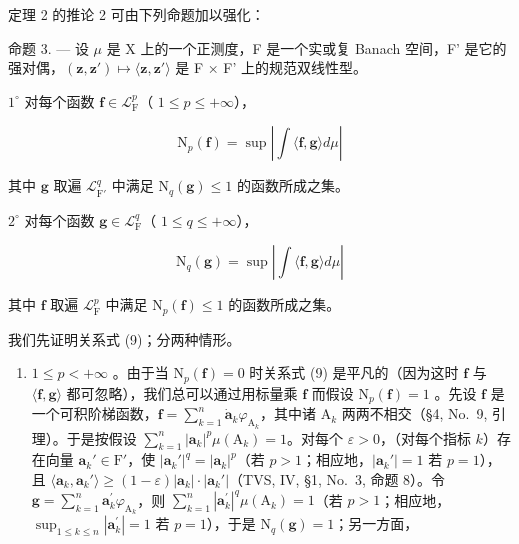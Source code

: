 定理 2 的推论 2 可由下列命题加以强化：

命题 3. --- 设 \(\mu\) 是 X 上的一个正测度，F 是一个实或复 Banach 空间，F' 是它的强对偶，\((\mathbf{z},\mathbf{z}')\mapsto\langle\mathbf{z},\mathbf{z}'\rangle\) 是 F × F' 上的规范双线性型。

\(1^{\circ}\) 对每个函数 \(\mathbf{f} \in \mathcal{L}_{\mathrm{F}}^{p}\)（ \(1 \leqslant p \leqslant +\infty\)），

\[
\mathrm{N} _ {p} (\mathbf {f}) = \sup \left| \int \langle \mathbf {f}, \mathbf {g} \rangle d \mu \right|\tag{9}
\]

其中 \(\mathbf{g}\) 取遍 \(\mathcal{L}_{\mathrm{F}'}^q\) 中满足 \(\mathrm{N}_q(\mathbf{g}) \leqslant 1\) 的函数所成之集。

\(2^{\circ}\) 对每个函数 \(\mathbf{g} \in \mathcal{L}_{\mathrm{F}}^{q}\)（ \(1 \leqslant q \leqslant +\infty\)），

\[
\mathrm{N} _ {q} (\mathbf {g}) = \sup \left| \int \langle \mathbf {f}, \mathbf {g} \rangle d \mu \right|\tag{10}
\]

其中 \(\mathbf{f}\) 取遍 \(\mathcal{L}_{\mathrm{F}}^{p}\) 中满足 \(\mathrm{N}_p(\mathbf{f})\leqslant 1\) 的函数所成之集。

我们先证明关系式 (9)；分两种情形。

\begin{enumerate}
\def\labelenumi{(\roman{enumi})}
\tightlist
\item
  \(1 \leqslant p < +\infty\) 。由于当 \(\mathrm{N}_p(\mathbf{f}) = 0\) 时关系式 (9) 是平凡的（因为这时 \(\mathbf{f}\) 与 \(\langle \mathbf{f}, \mathbf{g} \rangle\) 都可忽略），我们总可以通过用标量乘 \(\mathbf{f}\) 而假设 \(\mathrm{N}_p(\mathbf{f}) = 1\) 。先设 \(\mathbf{f}\) 是一个可积阶梯函数，\(\mathbf{f} = \sum_{k=1}^{n} \dot{\mathbf{a}}_k \varphi_{\mathrm{A}_k}\)，其中诸 \(\mathrm{A}_k\) 两两不相交（§4, No.~9, 引理）。于是按假设 \(\sum_{k=1}^{n} |\mathbf{a}_k|^p \mu(\mathrm{A}_k) = 1\)。对每个 \(\varepsilon > 0\)，（对每个指标 \(k\)）存在向量 \(\mathbf{a}_k' \in \mathrm{F}'\)，使 \(|\mathbf{a}_k'|^q = |\mathbf{a}_k|^p\)（若 \(p > 1\)；相应地，\(|\mathbf{a}_k'| = 1\) 若 \(p = 1\)），且 \(\langle \mathbf{a}_k, \mathbf{a}_k' \rangle \geqslant (1 - \varepsilon) |\mathbf{a}_k| \cdot |\mathbf{a}_k'|\)（TVS, IV, §1, No.~3, 命题 8）。令 \(\mathbf{g} = \sum_{k=1}^{n} \mathbf{a}_{k}^{\prime} \varphi_{\mathrm{A}_{k}}\)，则 \(\sum_{k=1}^{n} |\mathbf{a}_{k}^{\prime}|^{q} \mu(\mathrm{A}_{k}) = 1\)（若 \(p > 1\)；相应地，\(\sup_{1 \leqslant k \leqslant n} |\mathbf{a}_{k}^{\prime}| = 1\) 若 \(p = 1\)），于是 \(\mathrm{N}_{q}(\mathbf{g}) = 1\)；另一方面，
\end{enumerate}

